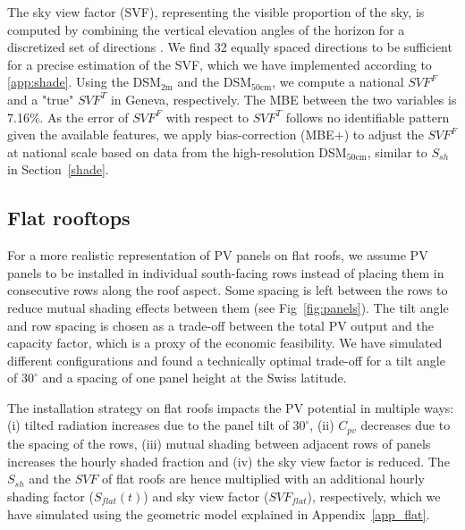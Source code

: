 The sky view factor (SVF), representing the visible proportion of the sky, is computed by combining the vertical elevation angles of the horizon for a discretized set of directions \cite{zaksek_sky-view_2011}. We find 32 equally spaced directions to be sufficient for a precise estimation of the SVF, which we have implemented according to \ref{app:shade}.
Using the DSM$_{2\text{m}}$ and the DSM$_{50\text{cm}}$, we compute a national $\mathit{SVF}^F$ and a "true" $\mathit{SVF}^T$ in Geneva, respectively. The MBE between the two variables is 7.16\%.  
As the error of $\mathit{SVF}^F$ with respect to $\mathit{SVF}^T$ follows no identifiable pattern given the available features, we apply bias-correction (MBE+) to adjust the $\mathit{SVF}^F$ at national scale based on data from the high-resolution DSM$_{50\text{cm}}$, similar to $S_{sh}$ in Section~\ref{shade}.


\subsection{Flat rooftops}
\label{flat}

For a more realistic representation of PV panels on flat roofs, we assume PV panels to be installed in individual south-facing rows instead of placing them in consecutive rows along the roof aspect. Some spacing is left between the rows to reduce mutual shading effects between them (see Fig~\ref{fig:panels}).
The tilt angle and row spacing is chosen as a trade-off between the total PV output and the capacity factor, which is a proxy of the economic feasibility.
We have simulated different configurations and found a technically optimal trade-off for a tilt angle of $30^\circ$ and a spacing of one panel height at the Swiss latitude.

The installation strategy on flat roofs impacts the PV potential in multiple ways: (i) tilted radiation increases due to the panel tilt of $30^\circ$, (ii) $C_{\mathit{pv}}$ decreases due to the spacing of the rows, (iii) mutual shading between adjacent rows of panels increases the hourly shaded fraction and (iv) the sky view factor is reduced. The $S_{sh}$ and the $\mathit{SVF}$ of flat roofs are hence multiplied with an additional hourly shading factor ($S_{\mathit{flat}}(t)$) and sky view factor ($\mathit{SVF}_{\mathit{flat}}$), respectively, which we have simulated using the geometric model explained in Appendix~\ref{app_flat}. 

